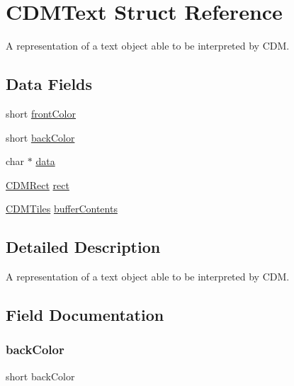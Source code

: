 \hypertarget{struct_c_d_m_text}{}\section{C\+D\+M\+Text Struct Reference}
\label{struct_c_d_m_text}


A representation of a text object able to be interpreted by C\+DM.  


\subsection*{Data Fields}
\begin{DoxyCompactItemize}
\item 
short \mbox{\hyperlink{struct_c_d_m_text_aaacd880862e20179647e2a4423a6fdd0}{front\+Color}}
\item 
short \mbox{\hyperlink{struct_c_d_m_text_a775cc897fb48457073cae34a85b735fe}{back\+Color}}
\item 
char $\ast$ \mbox{\hyperlink{struct_c_d_m_text_a91a70b77df95bd8b0830b49a094c2acb}{data}}
\item 
\mbox{\hyperlink{_c_d_m_8h_a23402dc2128c3c7f1e88e505a5631b9c}{C\+D\+M\+Rect}} \mbox{\hyperlink{struct_c_d_m_text_aa61e26c3b59930152cdaa0ce2dac8b14}{rect}}
\item 
\mbox{\hyperlink{struct_c_d_m_tiles}{C\+D\+M\+Tiles}} \mbox{\hyperlink{struct_c_d_m_text_a095e3adb5378aedc48f9a15d9f2e84b9}{buffer\+Contents}}
\end{DoxyCompactItemize}


\subsection{Detailed Description}
A representation of a text object able to be interpreted by C\+DM. 

\subsection{Field Documentation}
\mbox{\label{struct_c_d_m_text_a775cc897fb48457073cae34a85b735fe}} 
\subsubsection{\texorpdfstring{back\+Color}{backColor}}
{\footnotesize\ttfamily short back\+Color}

